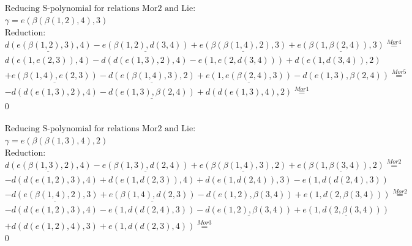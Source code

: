 \documentclass[11pt]{amsart}
\begin{document}
\begin{align*} 
& \text{Reducing S-polynomial for relations Mor2 and Lie:} \\ 
& \gamma = e(\beta(\beta(1,2),4),3) \\ 
& \text{Reduction}: \\&\underline{d(e(\beta(1,2),3),4)} - \underline{e(\beta(1,2),d(3,4))} + \underline{e(\beta(\beta(1,4),2),3)} + \underline{e(\beta(1,\beta(2,4)),3)} \stackrel{ Mor4 }{=}  \\ 
&d(e(1,e(2,3)),4) - d(d(e(1,3),2),4) - e(1,e(2,d(3,4))) + d(e(1,d(3,4)),2)\\ 
 &  + \underline{e(\beta(1,4),e(2,3))} - \underline{d(e(\beta(1,4),3),2)} + \underline{e(1,e(\beta(2,4),3))} - d(e(1,3),\beta(2,4)) \stackrel{ Mor5 }{=}  \\ 
& - d(d(e(1,3),2),4) - \underline{d(e(1,3),\beta(2,4))} + d(d(e(1,3),4),2) \stackrel{ Mor1 }{=}  \\ 
&0\\ 
\end{align*} 
 
\begin{align*} 
& \text{Reducing S-polynomial for relations Mor2 and Lie:} \\ 
& \gamma = e(\beta(\beta(1,3),4),2) \\ 
& \text{Reduction}: \\&\underline{d(e(\beta(1,3),2),4)} - \underline{e(\beta(1,3),d(2,4))} + \underline{e(\beta(\beta(1,4),3),2)} + \underline{e(\beta(1,\beta(3,4)),2)} \stackrel{ Mor2 }{=}  \\ 
& - d(d(e(1,2),3),4) + d(e(1,d(2,3)),4) + d(e(1,d(2,4)),3) - e(1,d(d(2,4),3))\\ 
 &  - \underline{d(e(\beta(1,4),2),3)} + \underline{e(\beta(1,4),d(2,3))} - d(e(1,2),\beta(3,4)) + e(1,d(2,\beta(3,4))) \stackrel{ Mor2 }{=}  \\ 
& - d(d(e(1,2),3),4) - e(1,d(d(2,4),3)) - \underline{d(e(1,2),\beta(3,4))} + \underline{e(1,d(2,\beta(3,4)))}\\ 
 &  + d(d(e(1,2),4),3) + e(1,d(d(2,3),4)) \stackrel{ Mor3 }{=}  \\ 
&0\\ 
\end{align*} 
 
\end{document}
